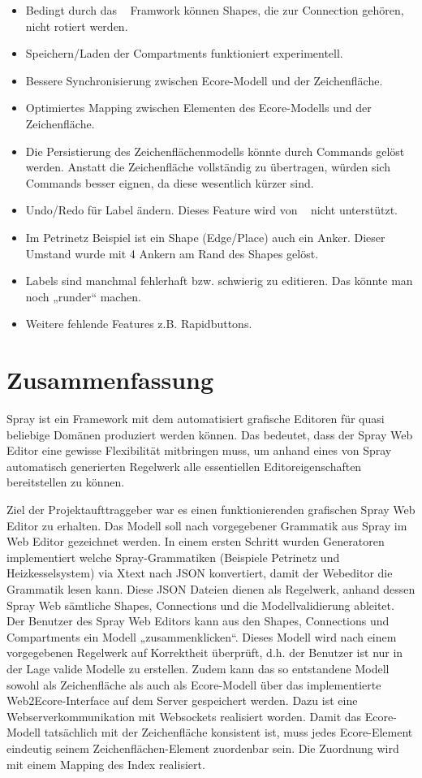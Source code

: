 \begin{itemize}
  \item Bedingt durch das \dd~ Framwork können Shapes, die zur Connection gehören, nicht rotiert werden.
  \item Speichern/Laden der Compartments funktioniert experimentell. 
  \item Bessere Synchronisierung zwischen Ecore-Modell und der Zeichenfläche.
  \item Optimiertes Mapping zwischen Elementen des Ecore-Modells und der Zeichenfläche.
  \item Die Persistierung des Zeichenflächenmodells könnte durch Commands gelöst werden. Anstatt die Zeichenfläche
  vollständig zu übertragen, würden sich Commands besser eignen, da diese wesentlich kürzer sind.
  \item Undo/Redo für Label ändern. Dieses Feature wird von \dd~ nicht unterstützt.
  \item Im Petrinetz Beispiel ist ein Shape (Edge/Place) auch ein Anker. Dieser Umstand wurde mit 4 Ankern am Rand des Shapes gelöst.
  \item Labels sind manchmal fehlerhaft bzw. schwierig zu editieren. Das könnte man noch „runder“ machen.
  \item Weitere fehlende Features z.B. Rapidbuttons.
\end{itemize}


\section{Zusammenfassung}

Spray ist ein Framework mit dem automatisiert grafische Editoren für quasi
beliebige Domänen produziert werden können. Das bedeutet, dass der Spray Web Editor
eine gewisse Flexibilität mitbringen muss, um anhand eines von
Spray automatisch generierten Regelwerk alle essentiellen Editoreigenschaften
bereitstellen zu können.

Ziel der Projektaufttraggeber war es einen funktionierenden grafischen Spray Web
Editor zu erhalten. Das Modell soll nach vorgegebener Grammatik aus Spray im Web Editor gezeichnet werden.
In einem ersten Schritt wurden Generatoren implementiert welche Spray-Grammatiken
(Beispiele Petrinetz und Heizkesselsystem) via Xtext nach JSON konvertiert, damit
der Webeditor die Grammatik lesen kann. Diese JSON Dateien dienen als Regelwerk,
anhand dessen Spray Web sämtliche Shapes, Connections und die Modellvalidierung
ableitet. Der Benutzer des Spray Web Editors kann aus den Shapes, Connections und Compartments ein Modell
„zusammenklicken“. Dieses Modell wird nach einem vorgegebenen Regelwerk auf
Korrektheit überprüft, d.h. der Benutzer ist nur in der Lage valide Modelle
zu erstellen. Zudem kann das so entstandene Modell sowohl als Zeichenfläche als auch als Ecore-Modell über
das implementierte Web2Ecore-Interface auf dem Server gespeichert werden. Dazu ist eine Webserverkommunikation mit Websockets
realisiert worden. Damit das Ecore-Modell tatsächlich mit der Zeichenfläche konsistent ist, muss jedes Ecore-Element
eindeutig seinem Zeichenflächen-Element zuordenbar sein. Die Zuordnung wird mit einem Mapping des Index realisiert.

